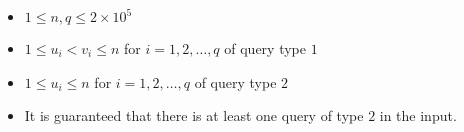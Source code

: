 \begin{itemize}
    \tightlist
    \item $1 \leq n, q \leq 2 \times 10 ^ 5$
    \item $1 \leq u_i < v_i \leq n$ for $i = 1, 2, \ldots, q$ of query type $1$
    \item $1 \leq u_i \leq n$ for $i = 1, 2, \ldots, q$ of query type $2$
    \item It is guaranteed that there is at least one query of type $2$ in the input.
\end{itemize}
    